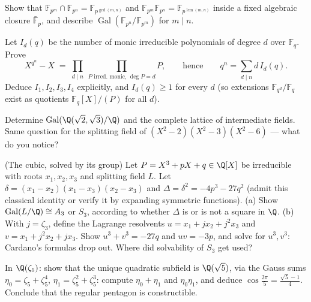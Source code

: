 \begin{exercise}[$\star\star$]\label{exo:b3:galois:5}
Show that $\mathbb F_{p^m} \cap \mathbb F_{p^n} = \mathbb
F_{p^{\gcd(m,n)}}$ and $\mathbb F_{p^m}\mathbb F_{p^n} = \mathbb
F_{p^{\operatorname{lcm}(m,n)}}$ inside a fixed algebraic
closure $\bar{\mathbb F}_p$, and describe
$\operatorname{Gal}(\mathbb F_{p^n}/\mathbb F_{p^m})$ for $m
\mid n$.
\end{exercise}

\begin{exercise}[$\star\star$]\label{exo:b3:galois:6}
Let $I_d(q)$ be the number of monic irreducible polynomials of
degree $d$ over $\mathbb F_q$. Prove
\[
X^{q^n} - X \;=\; \prod_{d \mid n}\ \prod_{P \text{ irred.
monic, } \deg P = d} P ,
\qquad\text{hence}\qquad
q^n = \sum_{d \mid n} d\, I_d(q).
\]
Deduce $I_1, I_2, I_3, I_4$ explicitly, and $I_d(q) \geq 1$ for
every $d$ (so extensions $\mathbb F_{q^d}/\mathbb F_q$ exist as
quotients $\mathbb F_q[X]/(P)$ for all $d$).
\end{exercise}

\begin{exercise}[$\star\star$]\label{exo:b3:galois:7}
Determine $\operatorname{Gal}(\Q(\sqrt2,\sqrt3)/\Q)$ and the
complete lattice of intermediate fields. Same question for the
splitting field of $(X^2-2)(X^2-3)(X^2-6)$ --- what do you
notice?
\end{exercise}

\begin{exercise}[$\star\star$]\label{exo:b3:galois:8}
(The cubic, solved by its group) Let $P = X^3 + pX + q \in
\Q[X]$ be irreducible with roots $x_1, x_2, x_3$ and splitting
field $L$. Let $\delta = (x_1 - x_2)(x_1 - x_3)(x_2 - x_3)$ and
$\Delta = \delta^2 = -4p^3 - 27q^2$ (admit this classical
identity or verify it by expanding symmetric functions).
(a) Show $\operatorname{Gal}(L/\Q) \cong A_3$ or $S_3$, according
to whether $\Delta$ is or is not a square in $\Q$.
(b) With $j = \zeta_3$, define the Lagrange resolvents $u = x_1
+ jx_2 + j^2x_3$ and $v = x_1 + j^2x_2 + jx_3$. Show $u^3 + v^3
= -27q$ and $uv = -3p$, and solve for $u^3, v^3$: Cardano's
formulas drop out. Where did solvability of $S_3$ get used?
\end{exercise}

\begin{exercise}[$\star\star$]\label{exo:b3:galois:9}
In $\Q(\zeta_5)$: show that the unique quadratic subfield is
$\Q(\sqrt5)$, via the Gauss sums $\eta_0 = \zeta_5 + \zeta_5^4$,
$\eta_1 = \zeta_5^2 + \zeta_5^3$: compute $\eta_0 + \eta_1$ and
$\eta_0\eta_1$, and deduce $\cos\frac{2\pi}5 = \frac{\sqrt5 -
1}4$. Conclude that the regular pentagon is constructible.
\end{exercise}

